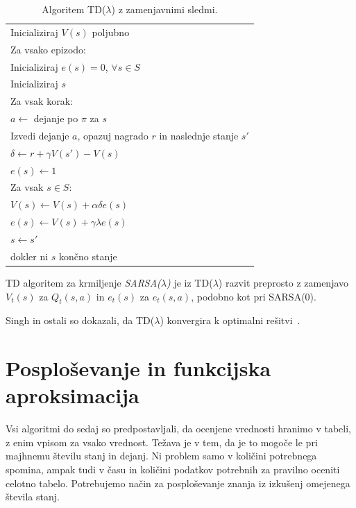 \documentclass[a4paper, oneside, 12pt]{report}
\begin{document}
\begin{table}[htbp]
\begin{center}
\begin{tabular}{| l |}
\hline
Inicializiraj $V(s)$ poljubno \\
Za vsako epizodo: \\
\quad Inicializiraj $e(s) = 0$, $\forall s \in S$ \\
\quad Inicializiraj $s$ \\
\quad Za vsak korak: \\
\quad \quad $a \gets$ dejanje po $\pi$ za $s$ \\
\quad \quad Izvedi dejanje $a$, opazuj nagrado $r$ in naslednje stanje $s'$ \\
\quad \quad $\delta \gets r + \gamma V(s') - V(s)$ \\
\quad \quad $e(s) \gets 1$ \\
\quad \quad Za vsak $s \in S$: \\
\quad \quad \quad $V(s) \gets V(s) + \alpha \delta e(s)$ \\
\quad \quad \quad $e(s) \gets V(s) + \gamma \lambda e(s)$ \\
\quad \quad $s \gets s'$ \\
\quad dokler ni $s$ končno stanje \\
\hline
\end{tabular}
\end{center}
\caption{Algoritem TD($\lambda$) z zamenjavnimi sledmi.}
\label{table:TDLambda}
\end{table}

TD algoritem za krmiljenje {\em SARSA($\lambda$)} je iz TD($\lambda$) razvit preprosto z zamenjavo $V_t(s)$ za $Q_t(s, a)$ in $e_t(s)$ za $e_t(s,a)$, podobno kot pri SARSA(0).

Singh in ostali so dokazali, da TD($\lambda$) konvergira k optimalni rešitvi~\cite{LearningWithoutStateEstimationInPartiallyObservableMarkovianDecisionProcesses}.

\chapter{Posploševanje in funkcijska aproksimacija} \label{chapter:FASolutions}
\thispagestyle{fancy}
Vsi algoritmi do sedaj so predpostavljali, da ocenjene vrednosti hranimo v tabeli, z enim vpisom za vsako vrednost. Težava je v tem, da je to mogoče le pri majhnemu številu stanj in dejanj. Ni problem samo v količini potrebnega spomina, ampak tudi v času in količini podatkov potrebnih za pravilno oceniti celotno tabelo. Potrebujemo način za posploševanje znanja iz izkušenj omejenega števila stanj.
\end{document}

